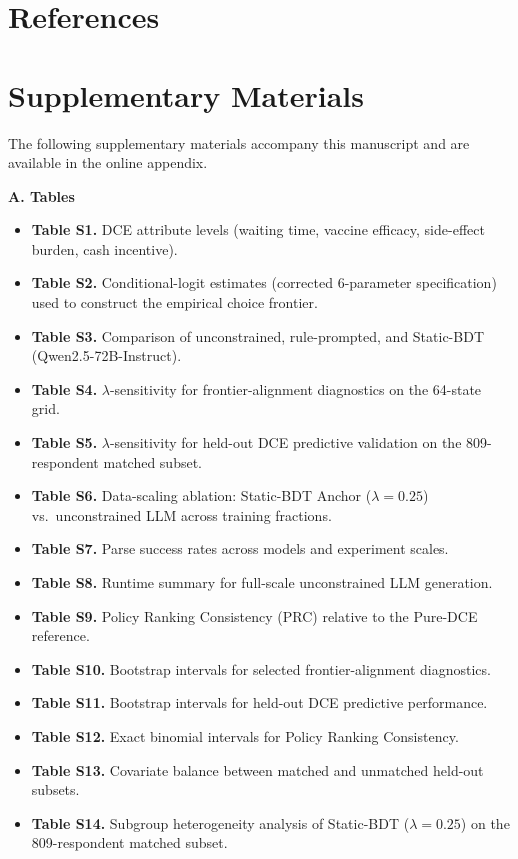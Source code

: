 \documentclass[11pt]{article}
\begin{document}
\clearpage
\section*{References}

\renewcommand{\refname}{}





\clearpage
\section*{Supplementary Materials}

The following supplementary materials accompany this manuscript and are available in the online appendix.

\textbf{A. Tables}
\begin{itemize}\setlength\itemsep{0pt}
\item \textbf{Table S1.} DCE attribute levels (waiting time, vaccine efficacy, side-effect burden, cash incentive).
\item \textbf{Table S2.} Conditional-logit estimates (corrected 6-parameter specification) used to construct the empirical choice frontier.
\item \textbf{Table S3.} Comparison of unconstrained, rule-prompted, and Static-BDT (Qwen2.5-72B-Instruct).
\item \textbf{Table S4.} $\lambda$-sensitivity for frontier-alignment diagnostics on the 64-state grid.
\item \textbf{Table S5.} $\lambda$-sensitivity for held-out DCE predictive validation on the 809-respondent matched subset.
\item \textbf{Table S6.} Data-scaling ablation: Static-BDT Anchor ($\lambda=0.25$) vs.\ unconstrained LLM across training fractions.
\item \textbf{Table S7.} Parse success rates across models and experiment scales.
\item \textbf{Table S8.} Runtime summary for full-scale unconstrained LLM generation.
\item \textbf{Table S9.} Policy Ranking Consistency (PRC) relative to the Pure-DCE reference.
\item \textbf{Table S10.} Bootstrap intervals for selected frontier-alignment diagnostics.
\item \textbf{Table S11.} Bootstrap intervals for held-out DCE predictive performance.
\item \textbf{Table S12.} Exact binomial intervals for Policy Ranking Consistency.
\item \textbf{Table S13.} Covariate balance between matched and unmatched held-out subsets.
\item \textbf{Table S14.} Subgroup heterogeneity analysis of Static-BDT ($\lambda=0.25$) on the 809-respondent matched subset.
\end{itemize}
\end{document}
